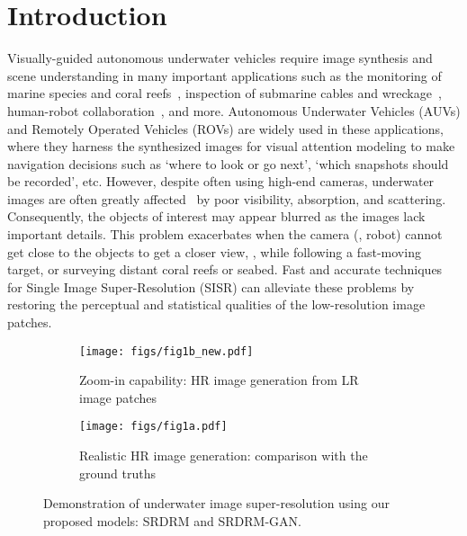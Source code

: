 \documentclass[10pt,twocolumn,letterpaper]{article}
\begin{document}
 \section{Introduction}
Visually-guided autonomous underwater vehicles require image synthesis and scene understanding in many important applications such as the monitoring of marine species and coral reefs~\cite{hoegh2007coral}, inspection of submarine cables and wreckage~\cite{bingham2010robotic}, human-robot collaboration~\cite{islam2018understanding}, and more.
Autonomous Underwater Vehicles (AUVs) and Remotely Operated Vehicles (ROVs) are widely used in these applications, where they harness the synthesized images for visual attention modeling to make navigation decisions such as `where to look or go next', `which snapshots should be recorded', etc. 
However, despite often using high-end cameras, underwater images are often greatly affected~\cite{islam2019fast} by poor visibility, absorption, and scattering. 
Consequently, the objects of interest may appear blurred as the images lack important details. 
This problem exacerbates when the camera (\ie, robot) cannot get close to the objects to get a closer view, \eg, while following a fast-moving target, or surveying distant coral reefs or seabed. Fast and accurate techniques for Single Image Super-Resolution (SISR) can alleviate these problems by restoring the perceptual and statistical qualities of the low-resolution image patches. 


\begin{figure}[t]
	\centering
	\begin{subfigure}{0.5\textwidth}
		\texttt{[image: figs/fig1b\_new.pdf]} 
		\caption{Zoom-in capability: HR image generation from LR image patches}
	\end{subfigure}
	
	\vspace{1mm}
	\begin{subfigure}{0.5\textwidth}
		\texttt{[image: figs/fig1a.pdf]} 
		\caption{Realistic HR image generation: comparison with the ground truths}
	\end{subfigure}
	
	\caption{Demonstration of underwater image super-resolution using our proposed models: SRDRM and SRDRM-GAN.}
	\label{fig:1}
\end{figure}
\end{document}
